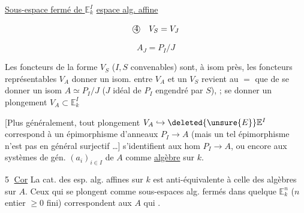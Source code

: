 
\uline{Sous-espace  fermé de $\mathbb E_k^I$} \uline{espace alg. affine}

\[
\text{\textcircled{4}}\quad V_S=V_J
\]



\[
A_J=P_I/J
\]


 Les foncteurs de la forme $V_S$ ($I,S$ convenables) sont, à isom près, les foncteurs représentables $V_A$ donner un isom. entre $V_A$ et un $V_S$  revient au $=$ que de se donner un isom $A\simeq P_I/J$ ($J$ idéal de $P_I$ engendré par $S$),  ; se donner un plongement $V_A\subset\mathbb E_k^I$  


[Plus généralement, tout plongement $V_A\hookrightarrow\deleted{\unsure{E}}\mathbb E^I$ correspond à un épimorphisme d'anneaux $P_I\to A$ (mais un tel épimorphisme n'est pas en général surjectif \ldots] s'identifient aux hom  $P_I\to A$, ou encore aux systèmes de gén. $(a_i)_{i\in I}$ de $A$ comme \uline{algèbre} sur $k$.


\textcircled{5} \uline{Cor} La cat. des esp. alg. affines sur $k$ est anti-équivalente à celle des algèbres sur $A$. Ceux qui se plongent comme sous-espaces alg. fermés dans quelque $\mathbb E_k^n$ ($n$ entier $\geq0$ fini)  correspondent aux $A$ qui  .

